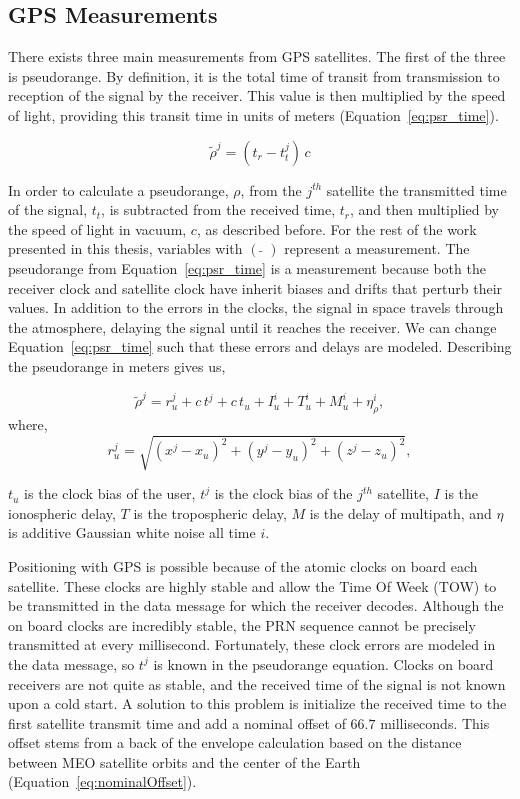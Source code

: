 \subsection{\textbf{GPS Measurements}}
There exists three main measurements from GPS satellites. The first of the three is pseudorange. By definition, it is the total time of transit from transmission to reception of the signal by the receiver. This value is then multiplied by the speed of light, providing this transit time in units of meters (Equation~\ref{eq:psr_time}).

\begin{equation}\label{eq:psr_time}
    \tilde{\rho}^j = (t_r - t_t^j)\,c
\end{equation}

In order to calculate a pseudorange, \(\rho \), from the \(j^{th}\) satellite the transmitted time of the signal, \(t_t\), is subtracted from the received time, \(t_r\), and then multiplied by the speed of light in vacuum, \(c\), as described before. For the rest of the work presented in this thesis, variables with \({\left(\;\tilde{}\;\right)}\) represent a measurement. The pseudorange from Equation~\ref{eq:psr_time} is a measurement because both the receiver clock and satellite clock have inherit biases and drifts that perturb their values. In addition to the errors in the clocks, the signal in space travels through the atmosphere, delaying the signal until it reaches the receiver. We can change Equation~\ref{eq:psr_time} such that these errors and delays are modeled. Describing the pseudorange in meters gives us,

\begin{equation}\label{eq:psr_meters}
    \tilde{\rho}^j = r_u^j + c\,t^j + c\,t_u + I^i_u + T^i_u+ M^i_u + \eta^i_{\rho},
\end{equation}
where,
\begin{equation}\label{eq:range_meters}
    r^j_u = \sqrt{{\left(x^j - x_u\right)}^2 + {\left(y^j - y_u\right)}^2 + {\left(z^j - z_u\right)}^2},
\end{equation}

\(t_u\) is the clock bias of the user, \(t^j\) is the clock bias of the \(j^{th}\) satellite, \(I\) is the ionospheric delay, \(T\) is the tropospheric delay, \(M\) is the delay of multipath, and \(\eta \) is additive Gaussian white noise all time \(i\).

Positioning with GPS is possible because of the atomic clocks on board each satellite. These clocks are highly stable and allow the Time Of Week (TOW) to be transmitted in the data message for which the receiver decodes. Although the on board clocks are incredibly stable, the PRN sequence cannot be precisely transmitted at every millisecond. Fortunately, these clock errors are modeled in the data message, so \(t^j\) is known in the pseudorange equation. Clocks on board receivers are not quite as stable, and the received time of the signal is not known upon a cold start. A solution to this problem is initialize the received time to the first satellite transmit time and add a nominal offset of \(66.7\) milliseconds. This offset stems from a back of the envelope calculation based on the distance between MEO satellite orbits and the center of the Earth (Equation~\ref{eq:nominalOffset}).

